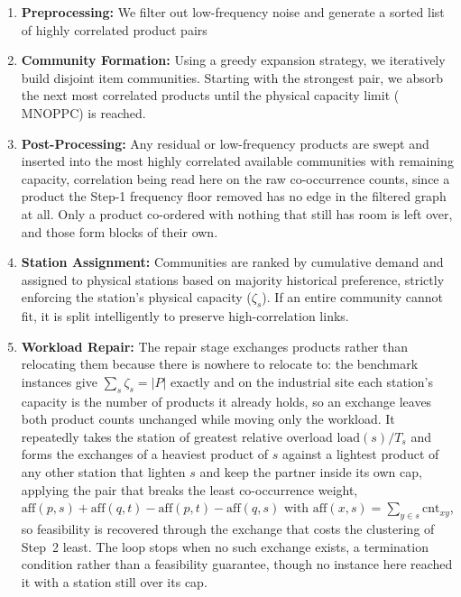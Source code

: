 \documentclass[]{interact}
\begin{document}
\begin{enumerate}
    \item \textbf{Preprocessing:} We filter out low-frequency noise and generate a sorted list of highly correlated product pairs %
    \item \textbf{Community Formation:} Using a greedy expansion strategy, we iteratively build disjoint item communities. Starting with the strongest pair, we absorb the next most correlated products until the physical capacity limit ($\mathrm{MNOPPC}$) is reached.
    \item \textbf{Post-Processing:} Any residual or low-frequency products are swept and inserted into the most highly correlated available communities with remaining capacity, correlation being read here on the raw co-occurrence counts, since a product the Step-1 frequency floor removed has no edge in the filtered graph at all. Only a product co-ordered with nothing that still has room is left over, and those form blocks of their own.
    \item \textbf{Station Assignment:} Communities are ranked by cumulative demand and assigned to physical stations based on majority historical preference, strictly enforcing the station's physical capacity ($\zeta_s$). If an entire community cannot fit, it is split intelligently to preserve high-correlation links.
    \item \textbf{Workload Repair:} The repair stage exchanges products rather than relocating them because there is nowhere to relocate to: the benchmark instances give $\sum_s \zeta_s = |P|$ exactly and on the industrial site each station's capacity is the number of products it already holds, so an exchange leaves both product counts unchanged while moving only the workload. It repeatedly takes the station of greatest relative overload $\mathrm{load}(s)/T_s$ and forms the exchanges of a heaviest product of $s$ against a lightest product of any other station that lighten $s$ and keep the partner inside its own cap, applying the pair that breaks the least co-occurrence weight, $\mathrm{aff}(p,s)+\mathrm{aff}(q,t)-\mathrm{aff}(p,t)-\mathrm{aff}(q,s)$ with $\mathrm{aff}(x,s)=\sum_{y\in s}\mathrm{cnt}_{xy}$, so feasibility is recovered through the exchange that costs the clustering of Step~2 least. The loop stops when no such exchange exists, a termination condition rather than a feasibility guarantee, though no instance here reached it with a station still over its cap.
\end{enumerate}
\end{document}
